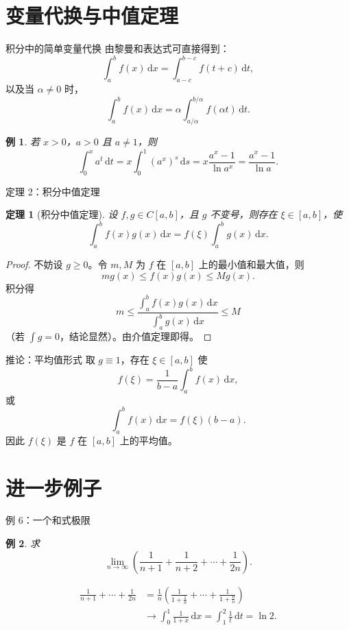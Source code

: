 ﻿\documentclass[aspectratio=169,11pt]{ctexbeamer}
\newtheorem{mythm}{定理}
\newtheorem{myex}{例}
\newcommand{\dd}{\,\mathrm{d}}
\begin{document}
\section{变量代换与中值定理}

\begin{frame}{积分中的简单变量代换}
  由黎曼和表达式可直接得到：
  \[
    \int_a^b f(x)\dd x=\int_{a-c}^{b-c}f(t+c)\dd t,
  \]
  以及当 $\alpha\ne0$ 时，
  \[
    \int_a^b f(x)\dd x
    =\alpha\int_{a/\alpha}^{b/\alpha}f(\alpha t)\dd t.
  \]

  \begin{myex}
  若 $x>0$，$a>0$ 且 $a\ne1$，则
  \[
    \int_0^x a^t\dd t
    =x\int_0^1 (a^x)^s\dd s
    =x\frac{a^x-1}{\ln a^x}
    =\frac{a^x-1}{\ln a}.
  \]
  \end{myex}
\end{frame}

\begin{frame}{定理 2：积分中值定理}
  \footnotesize
  \begin{mythm}[积分中值定理]
  设 $f,g\in C[a,b]$，且 $g$ 不变号，则存在 $\xi\in[a,b]$，使
  \[
    \int_a^b f(x)g(x)\dd x
    =f(\xi)\int_a^b g(x)\dd x.
  \]
  \end{mythm}

  \begin{proof}
  不妨设 $g\ge0$。令 $m,M$ 为 $f$ 在 $[a,b]$ 上的最小值和最大值，则
  \[
    m g(x)\le f(x)g(x)\le M g(x).
  \]
  积分得
  \[
    m\le
    \frac{\int_a^b f(x)g(x)\dd x}{\int_a^b g(x)\dd x}
    \le M
  \]
  （若 $\int g=0$，结论显然）。由介值定理即得。
  \end{proof}
\end{frame}

\begin{frame}{推论：平均值形式}
  取 $g\equiv1$，存在 $\xi\in[a,b]$ 使
  \[
    f(\xi)=\frac1{b-a}\int_a^b f(x)\dd x,
  \]
  或
  \[
    \int_a^b f(x)\dd x=f(\xi)(b-a).
  \]
  因此 $f(\xi)$ 是 $f$ 在 $[a,b]$ 上的平均值。
\end{frame}

\section{进一步例子}

\begin{frame}{例 6：一个和式极限}
  \begin{myex}
  求
  \[
    \lim_{n\to\infty}\left(\frac1{n+1}+\frac1{n+2}+\cdots+\frac1{2n}\right).
  \]
  \end{myex}

  \[
  \begin{aligned}
    \frac1{n+1}+\cdots+\frac1{2n}
    &=\frac1n\left(\frac1{1+\frac1n}+\cdots+\frac1{1+\frac nn}\right)\\
    &\longrightarrow\int_0^1\frac1{1+x}\dd x
    =\int_1^2\frac1t\dd t=\ln2.
  \end{aligned}
  \]
\end{frame}
\end{document}
